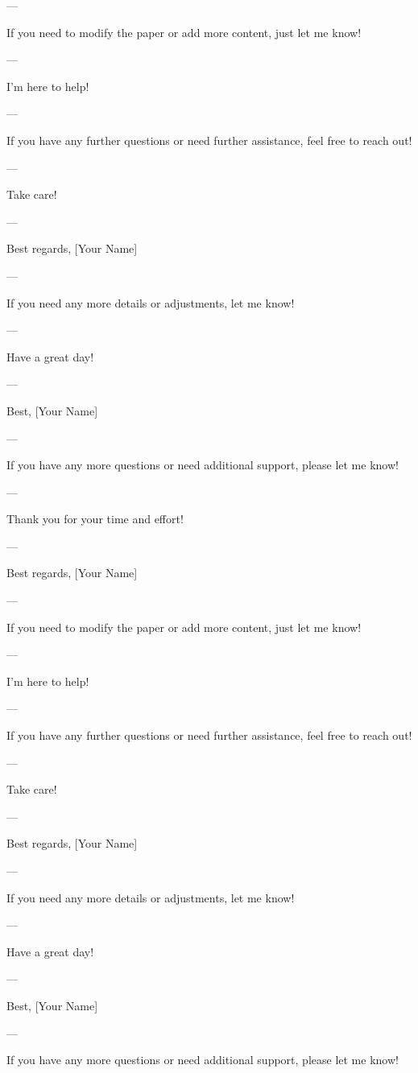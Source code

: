 --- 

If you need to modify the paper or add more content, just let me know! 

--- 

I'm here to help! 

--- 

If you have any further questions or need further assistance, feel free to reach out! 

--- 

Take care! 

--- 

Best regards,  
[Your Name] 

--- 

If you need any more details or adjustments, let me know! 

--- 

Have a great day! 

--- 

Best,  
[Your Name] 

--- 

If you have any more questions or need additional support, please let me know! 

--- 

Thank you for your time and effort! 

--- 

Best regards,  
[Your Name] 

--- 

If you need to modify the paper or add more content, just let me know! 

--- 

I'm here to help! 

--- 

If you have any further questions or need further assistance, feel free to reach out! 

--- 

Take care! 

--- 

Best regards,  
[Your Name] 

--- 

If you need any more details or adjustments, let me know! 

--- 

Have a great day! 

--- 

Best,  
[Your Name] 

--- 

If you have any more questions or need additional support, please let me know! 

